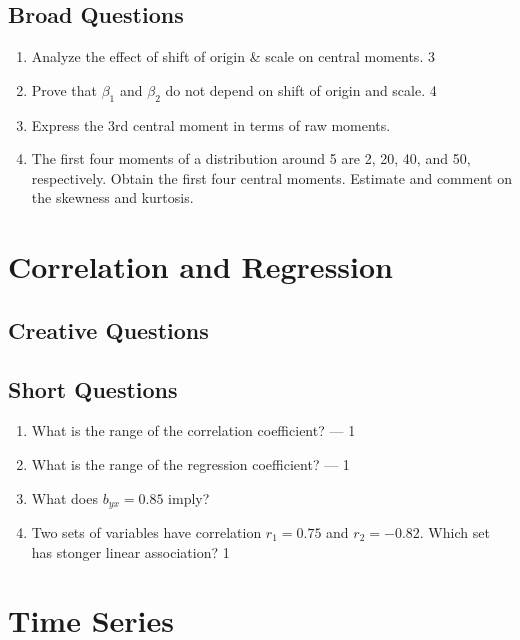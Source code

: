 \documentclass[a4paper,oneside]{book}
\begin{document}
\section{Broad Questions}
    \begin{enumerate}
    \item Analyze the effect of shift of origin \& scale on central moments. \hfill 3
    \item Prove that $\beta_1$ and $\beta_2$ do not depend on shift of origin and scale. \hfill 4
    \item Express the 3rd central moment in terms of raw moments. 
    \item The first four moments of a distribution around 5 are 2, 20, 40, and 50, respectively. Obtain the first four central moments. Estimate and comment on the skewness and kurtosis. 
    \end{enumerate}

\chapter{Correlation and Regression} 
\section{Creative Questions}
\section{Short Questions}

  \begin{enumerate}
  
  \item What is the range of the correlation coefficient? --- \hfill 1
  \item What is the range of the regression coefficient? --- \hfill 1
  \item What does $b_{yx} = 0.85$ imply? 
  \item Two sets of variables have correlation $r_1 = 0.75$ and $r_2 = -0.82$. Which set has stonger linear association? \hfill 1
  \end{enumerate}

\chapter{Time Series} 
\end{document}
